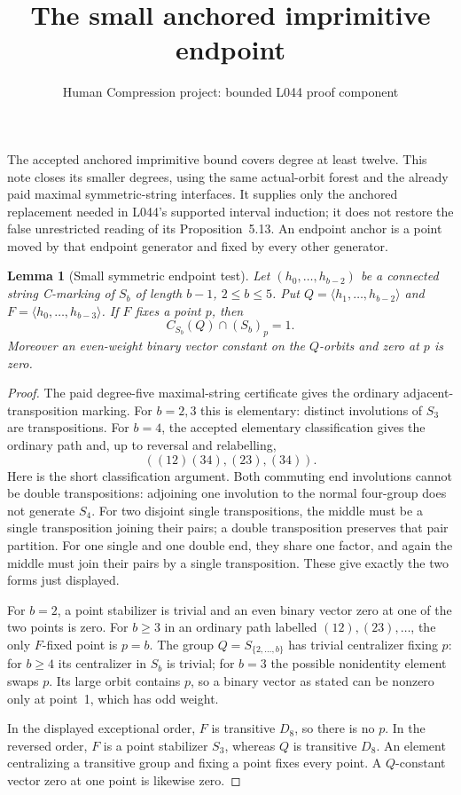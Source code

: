 \documentclass[11pt,a4paper]{article}
\title{The small anchored imprimitive endpoint}
\author{Human Compression project: bounded L044 proof component}
\date{}
\newtheorem{lemma}{Lemma}
\newcommand{\gen}[1]{\langle#1\rangle}
\begin{document}
\maketitle
The accepted anchored imprimitive bound covers degree at least twelve.
This note closes its smaller degrees, using the same actual-orbit
forest and the already paid maximal symmetric-string interfaces.
It supplies only the anchored replacement needed in L044's supported
interval induction; it does not restore the false unrestricted
reading of its Proposition~5.13. An endpoint anchor is a point moved
by that endpoint generator and fixed by every other generator.

\begin{lemma}[Small symmetric endpoint test]\label{lem:small}
Let $(h_0,\ldots,h_{b-2})$ be a connected string C-marking of
$S_b$ of length $b-1$, $2\leq b\leq5$. Put
$Q=\gen{h_1,\ldots,h_{b-2}}$ and
$F=\gen{h_0,\ldots,h_{b-3}}$. If $F$ fixes a point $p$, then
\[
                 C_{S_b}(Q)\cap (S_b)_p=1.
\]
Moreover an even-weight binary vector constant on the $Q$-orbits
and zero at $p$ is zero.
\end{lemma}
\begin{proof}
The paid degree-five maximal-string certificate gives the ordinary
adjacent-transposition marking. For $b=2,3$ this is elementary:
distinct involutions of $S_3$ are transpositions. For $b=4$, the
accepted elementary classification gives the ordinary path and,
up to reversal and relabelling,
\[
                  ((12)(34),(23),(34)).
\]
Here is the short classification argument. Both commuting end
involutions cannot be double transpositions: adjoining one
involution to the normal four-group does not generate $S_4$.
For two disjoint single transpositions, the middle must be a
single transposition joining their pairs; a double transposition
preserves that pair partition. For one single and one double
end, they share one factor, and again the middle must join
their pairs by a single transposition. These give exactly the
two forms just displayed.

For $b=2$, a point stabilizer is trivial and an even binary
vector zero at one of the two points is zero. For $b\geq3$ in
an ordinary path labelled $(12),(23),\ldots$, the only
$F$-fixed point is $p=b$. The group $Q=S_{\{2,\ldots,b\}}$
has trivial centralizer fixing $p$: for $b\geq4$ its centralizer
in $S_b$ is trivial; for $b=3$ the possible nonidentity element
swaps $p$. Its large
orbit contains $p$, so a binary vector as stated can be nonzero
only at point~1, which has odd weight.

In the displayed exceptional order, $F$ is transitive $D_8$,
so there is no $p$. In the reversed order, $F$ is a point
stabilizer $S_3$, whereas $Q$ is transitive $D_8$. An element
centralizing a transitive group and fixing a point fixes every
point. A $Q$-constant vector zero at one point is likewise zero.
\end{proof}
\end{document}
